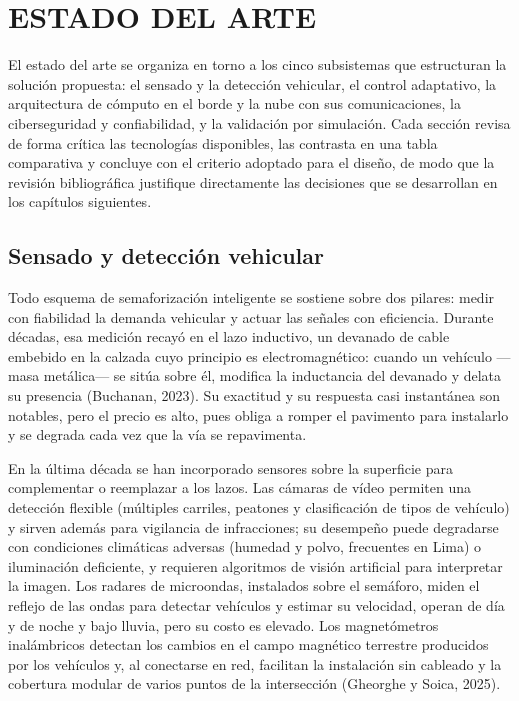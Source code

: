 \chapter{ESTADO DEL ARTE}\label{cap:estado-arte}

El estado del arte se organiza en torno a los cinco subsistemas que estructuran la solución propuesta: el
sensado y la detección vehicular, el control adaptativo, la arquitectura de cómputo en el borde y la nube
con sus comunicaciones, la ciberseguridad y confiabilidad, y la validación por simulación. Cada sección
revisa de forma crítica las tecnologías disponibles, las contrasta en una tabla comparativa y concluye con
el criterio adoptado para el diseño, de modo que la revisión bibliográfica justifique directamente las
decisiones que se desarrollan en los capítulos siguientes.

\section{Sensado y detección vehicular}\label{sec:sensado}

Todo esquema de semaforización inteligente se sostiene sobre dos pilares: medir con fiabilidad la demanda
vehicular y actuar las señales con eficiencia. Durante décadas, esa medición recayó en el lazo inductivo, un
devanado de cable embebido en la calzada cuyo principio es electromagnético: cuando un vehículo —masa
metálica— se sitúa sobre él, modifica la inductancia del devanado y delata su presencia (Buchanan, 2023). Su
exactitud y su respuesta casi instantánea son notables, pero el precio es alto, pues obliga a romper el
pavimento para instalarlo y se degrada cada vez que la vía se repavimenta.

En la última década se han incorporado sensores sobre la superficie para complementar o reemplazar a los
lazos. Las cámaras de vídeo permiten una detección flexible (múltiples carriles, peatones y clasificación de
tipos de vehículo) y sirven además para vigilancia de infracciones; su desempeño puede degradarse con
condiciones climáticas adversas (humedad y polvo, frecuentes en Lima) o iluminación deficiente, y requieren
algoritmos de visión artificial para interpretar la imagen. Los radares de microondas, instalados sobre el
semáforo, miden el reflejo de las ondas para detectar vehículos y estimar su velocidad, operan de día y de
noche y bajo lluvia, pero su costo es elevado. Los magnetómetros inalámbricos detectan los cambios en el
campo magnético terrestre producidos por los vehículos y, al conectarse en red, facilitan la instalación sin
cableado y la cobertura modular de varios puntos de la intersección (Gheorghe y Soica, 2025).


